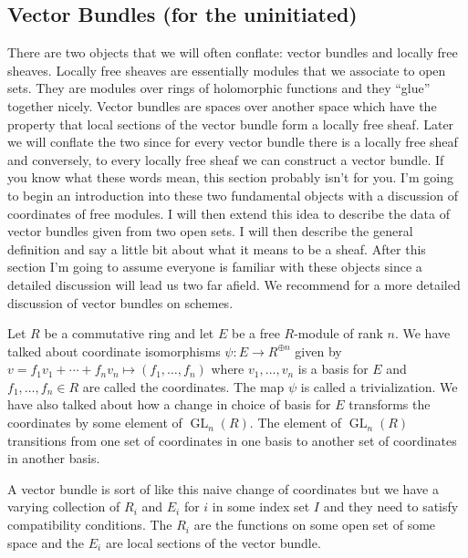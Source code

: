 \documentclass[12pt]{book}
\numberwithin{equation}{section}
\theoremstyle{definition}
\theoremstyle{remark}
\newcommand{\GL}{\operatorname{GL}}
\begin{document}
\subsection{Vector Bundles (for the uninitiated)}
There are two objects that we will often conflate: vector bundles and locally free sheaves. 
Locally free sheaves are essentially modules that we associate to open sets. 
They are modules over rings of holomorphic functions and they ``glue'' together nicely. 
Vector bundles are spaces over another space which have the property that local sections of the vector bundle form a locally free sheaf. 
Later we will conflate the two since for every vector bundle there is a locally free sheaf and conversely, to every locally free sheaf we can construct a vector bundle. 
If you know what these words mean, this section probably isn't for you. 
I'm going to begin an introduction into these two fundamental objects with a discussion of coordinates of free modules. 
I will then extend this idea to describe the data of vector bundles given from two open sets. 
I will then describe the general definition and say a little bit about what it means to be a sheaf. 
After this section I'm going to assume everyone is familiar with these objects since a detailed discussion will lead us two far afield. 
We recommend \cite{Vakil2017} for a more detailed discussion of vector  bundles on schemes.

Let $R$ be a commutative ring and let $E$ be a free $R$-module of rank $n$. 
We have talked about coordinate isomorphisms $\psi: E \to R^{\oplus n}$ given by $v=f_1v_1 + \cdots + f_n v_n \mapsto (f_1,\ldots,f_n)$ where $v_1,\ldots,v_n$ is a basis for $E$ and $f_1,\ldots,f_n\in R$ are called the coordinates. 
The map $\psi$ is called a trivialization. 
We have also talked about how a change in choice of basis for $E$ transforms the coordinates by some element of $\GL_n(R)$. 
The element of $\GL_n(R)$ transitions from one set of coordinates in one basis to another set of coordinates in another basis. 

A vector bundle is sort of like this naive change of coordinates but we have a varying collection of $R_i$ and $E_i$ for $i$ in some index set $I$ and they need to satisfy compatibility conditions.
The $R_i$ are the functions on some open set of some space and the $E_i$ are local sections of the vector bundle. 
\end{document}
